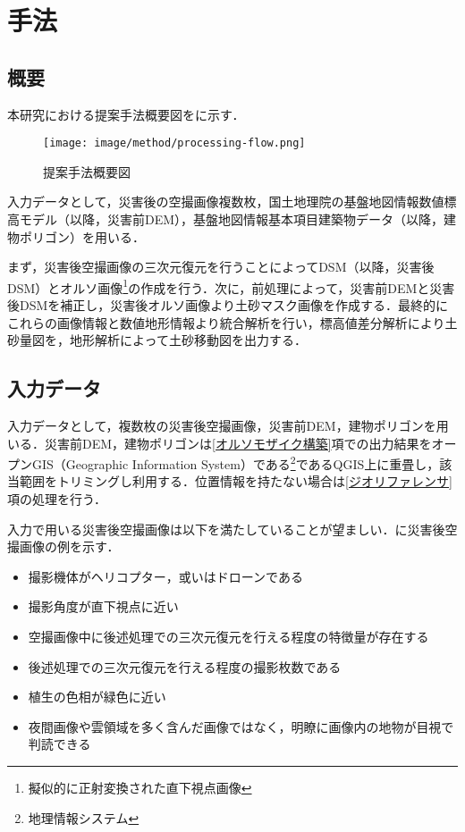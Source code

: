 \chapter{手法}
  \section{概要}
    本研究における提案手法概要図をに示す．

    \begin{figure}[t]
      \centering
      \texttt{[image: image/method/processing-flow.png]}
      \caption{提案手法概要図}
      \label{提案手法概要図}
    \end{figure}
    
    入力データとして，災害後の空撮画像複数枚，国土地理院の基盤地図情報数値標高モデル（以降，災害前DEM），基盤地図情報基本項目建築物データ\cite{基盤地図情報}（以降，建物ポリゴン）を用いる．

    まず，災害後空撮画像の三次元復元を行うことによってDSM（以降，災害後DSM）とオルソ画像\footnote{擬似的に正射変換された直下視点画像}の作成を行う．次に，前処理によって，災害前DEMと災害後DSMを補正し，災害後オルソ画像より土砂マスク画像を作成する．最終的にこれらの画像情報と数値地形情報より統合解析を行い，標高値差分解析により土砂量図を，地形解析によって土砂移動図を出力する．



  \section{入力データ}
    \label{入力データ}
    入力データとして，複数枚の災害後空撮画像，災害前DEM，建物ポリゴンを用いる．災害前DEM，建物ポリゴンは\ref{オルソモザイク構築}項での出力結果をオープンGIS（Geographic Information System）である\footnote{地理情報システム}であるQGIS\cite{QGIS}上に重畳し，該当範囲をトリミングし利用する．位置情報を持たない場合は\ref{ジオリファレンサ}項の処理を行う．

    入力で用いる災害後空撮画像は以下を満たしていることが望ましい．に災害後空撮画像の例を示す．

    \begin{itemize}
      \setlength{\itemsep}{-5pt}
      \item 撮影機体がヘリコプター，或いはドローンである
      \item 撮影角度が直下視点に近い
      \item 空撮画像中に後述処理での三次元復元を行える程度の特徴量が存在する
      \item 後述処理での三次元復元を行える程度の撮影枚数である
      \item 植生の色相が緑色に近い
      \item 夜間画像や雲領域を多く含んだ画像ではなく，明瞭に画像内の地物が目視で判読できる
    \end{itemize}

